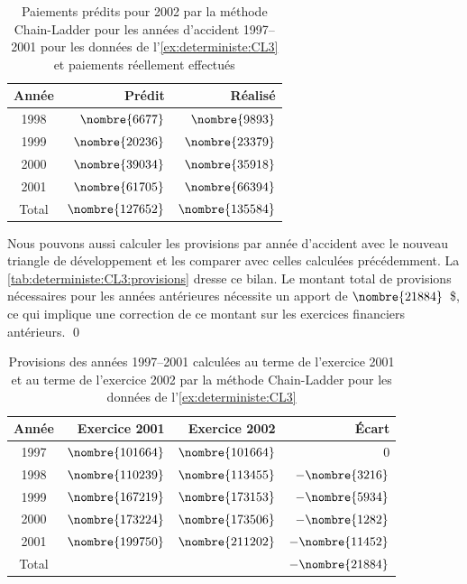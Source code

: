 \begin{exemple}
  \begin{table}
    \centering
    \caption{Paiements prédits pour 2002 par la méthode Chain-Ladder
      pour les années d'accident 1997--2001 pour les données de
      l'\autoref{ex:deterministe:CL3} et paiements réellement
      effectués}
    \label{tab:deterministe:CL3:paiements}
    \begin{tabular}{crr}
      \toprule
      Année & Prédit & Réalisé \\
      \midrule
      1998 & $\nombre{ 6677}$ & $\nombre{ 9893}$ \\
      1999 & $\nombre{20236}$ & $\nombre{23379}$ \\
      2000 & $\nombre{39034}$ & $\nombre{35918}$ \\
      2001 & $\nombre{61705}$ & $\nombre{66394}$ \\
      \midrule
      Total & $\nombre{127652}$ & $\nombre{135584}$ \\
      \bottomrule
    \end{tabular}
  \end{table}

  Nous pouvons aussi calculer les provisions par année d'accident avec
  le nouveau triangle de développement et les comparer avec celles
  calculées précédemment. La \autoref{tab:deterministe:CL3:provisions}
  dresse ce bilan. Le montant total de provisions nécessaires pour les
  années antérieures nécessite un apport de $\nombre{21884}$~\$, ce
  qui implique une correction de ce montant sur les exercices
  financiers antérieurs. %
  \qed

  \begin{table}
    \centering
    \caption{Provisions des années 1997--2001 calculées au terme de
      l'exercice 2001 et au terme de l'exercice 2002 par la méthode
      Chain-Ladder pour les données de
      l'\autoref{ex:deterministe:CL3}}
    \label{tab:deterministe:CL3:provisions}
    \begin{tabular}{crrr}
      \toprule
      Année & Exercice 2001 & Exercice 2002 & Écart \\
      \midrule
      1997 & $\nombre{101664}$ & $\nombre{101664}$ & $0$\\
      1998 & $\nombre{110239}$ & $\nombre{113455}$ & $-\nombre{3216}$ \\
      1999 & $\nombre{167219}$ & $\nombre{173153}$ & $-\nombre{5934}$ \\
      2000 & $\nombre{173224}$ & $\nombre{173506}$ & $-\nombre{1282}$ \\
      2001 & $\nombre{199750}$ & $\nombre{211202}$ & $-\nombre{11452}$ \\
      \midrule
      Total & & & $-\nombre{21884}$ \\
      \bottomrule
    \end{tabular}
  \end{table}
\end{exemple}

